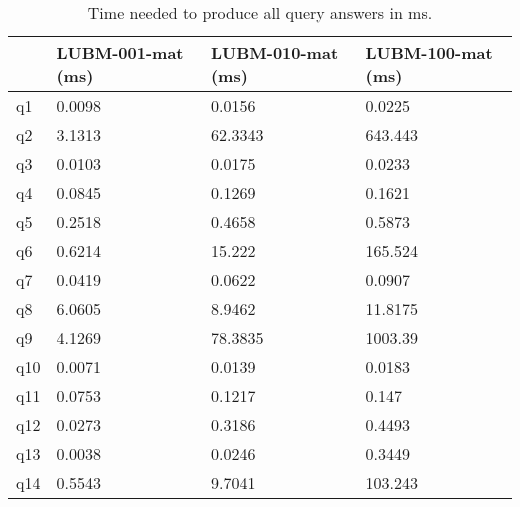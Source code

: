 \documentclass{article}
\begin{document}
\begin{enumerate}
\begin{table}[H]\centering
\begin{tabular}{|l|l|l|l|}
\hline
    & LUBM-001-mat (ms) & LUBM-010-mat (ms) & LUBM-100-mat (ms) \\ \hline
q1  & 0.0098            & 0.0156            & 0.0225            \\ \hline
q2  & 3.1313            & 62.3343           & 643.443           \\ \hline
q3  & 0.0103            & 0.0175            & 0.0233            \\ \hline
q4  & 0.0845            & 0.1269            & 0.1621            \\ \hline
q5  & 0.2518            & 0.4658            & 0.5873            \\ \hline
q6  & 0.6214             & 15.222           & 165.524           \\ \hline
q7  & 0.0419            & 0.0622            & 0.0907            \\ \hline
q8  & 6.0605            & 8.9462           & 11.8175           \\ \hline
q9  & 4.1269            & 78.3835           & 1003.39           \\ \hline
q10 & 0.0071            & 0.0139            & 0.0183            \\ \hline
q11 & 0.0753            & 0.1217            & 0.147            \\ \hline
q12 & 0.0273            & 0.3186            & 0.4493            \\ \hline
q13 & 0.0038            & 0.0246            & 0.3449            \\ \hline
q14 & 0.5543            & 9.7041           & 103.243           \\ \hline
\end{tabular}
\caption{Time needed to produce  all query answers in ms.}
\end{table}

\end{enumerate}
\end{document}
